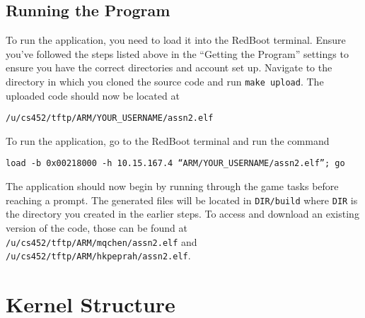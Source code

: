 \documentclass[12pt]{article}
\begin{document}
\subsection{Running the Program}
To run the application, you need to load it into the RedBoot terminal.  Ensure you've followed the steps listed above in the ``Getting the Program'' settings to ensure you have the correct directories and account set up.  Navigate to the directory in which you cloned the source code and run \texttt{make upload}.  The uploaded code should now be located at
\begin{center}
  \texttt{/u/cs452/tftp/ARM/YOUR\_USERNAME/assn2.elf}
\end{center}
To run the application, go to the RedBoot terminal and run the command
\begin{center}
  \texttt{load -b 0x00218000 -h 10.15.167.4 ``ARM/YOUR\_USERNAME/assn2.elf''; go}
\end{center}
The application should now begin by running through the game tasks before reaching a prompt.  The generated files will be located in \texttt{DIR/build} where \texttt{DIR} is the directory you created in the earlier steps.  To access and download an existing version of the code, those can be found at \texttt{/u/cs452/tftp/ARM/mqchen/assn2.elf} and \texttt{/u/cs452/tftp/ARM/hkpeprah/assn2.elf}.
\\[2\baselineskip]

\section{Kernel Structure}
\end{document}
